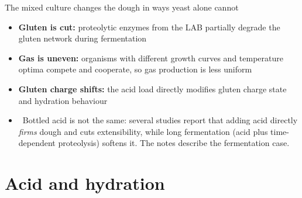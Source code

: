 \documentclass[aspectratio=169,11pt]{beamer}
\begin{document}
\begin{frame}{The mixed culture changes the dough in ways yeast alone cannot}
  \begin{itemize}\setlength{\itemsep}{0.15em}
    \item \textbf{Gluten is cut:} proteolytic enzymes from the LAB partially
      degrade the gluten network during fermentation
    \item \textbf{Gas is uneven:} organisms with different growth curves and
      temperature optima compete and cooperate, so gas production is less
      uniform
    \item \textbf{Gluten charge shifts:} the acid load directly modifies
      gluten charge state and hydration behaviour
    \item \contested\ Bottled acid is not the same: several studies report that
      adding acid directly \emph{firms} dough and cuts extensibility, while
      long fermentation (acid plus time-dependent proteolysis) softens it.
      The notes describe the fermentation case.
  \end{itemize}
\end{frame}

\section{Acid and hydration}
\end{document}
